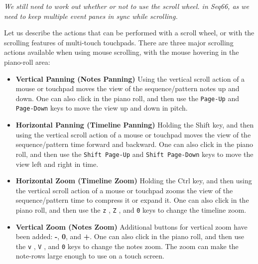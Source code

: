    \textsl{We still need to work out whether or not to use the scroll wheel.
   in Seq66, as we need to keep multiple event panes in sync while scrolling.}

   Let us describe the actions that can be performed with a
   scroll wheel, or with the scrolling features of multi-touch touchpads.
   There are three major scrolling actions available when using mouse
   scrolling, with the mouse hovering in the piano-roll area:

   \begin{itemize}
      \item \textbf{Vertical Panning (Notes Panning)}
         Using the vertical scroll action of a mouse or touchpad moves the
         view of the sequence/pattern notes up and down.
         One can also click in the piano roll, and then use the
         \texttt{Page-Up} 
         and \texttt{Page-Down} 
         keys to move the view up and down in pitch.
      \item \textbf{Horizontal Panning (Timeline Panning)}
         Holding the Shift key, and then using the vertical scroll action of a
         mouse or touchpad moves the view of the sequence/pattern time forward
         and backward.
         One can also click in the piano roll, and then use the
         \texttt{Shift Page-Up} 
         and \texttt{Shift Page-Down} 
         keys to move the view left and right in time.
      \item \textbf{Horizontal Zoom (Timeline Zoom)}
         Holding the Ctrl key, and then using the vertical scroll action of a
         mouse or touchpad zooms the view of the sequence/pattern time to
         compress it or expand it.
         One can also click in the piano roll, and then use the
         \texttt{z} ,
         \texttt{Z} , and
         \texttt{0}  keys to change the timeline zoom.
      \item \textbf{Vertical Zoom (Notes Zoom)}
         Additional buttons for vertical zoom have been added:
         \textbf{-},
         \textbf{0}, and
         \textbf{+}.
         One can also click in the piano roll, and then use the
         \texttt{v} ,
         \texttt{V} , and
         \texttt{0}  keys to change the notes zoom.
         The zoom can make the note-rows large enough to use on a touch screen.
   \end{itemize}

